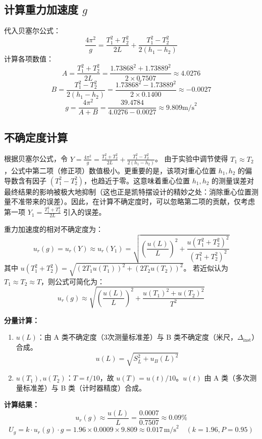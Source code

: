 \documentclass[12pt,a4paper]{article}
\begin{document}
\subsection*{计算重力加速度 $g$}
代入贝塞尔公式：
\[ \frac{4\pi^2}{g} = \frac{T_1^2 + T_2^2}{2L} + \frac{T_1^2 - T_2^2}{2(h_1 - h_2)} \]
计算各项数值：
\[ A = \frac{T_1^2 + T_2^2}{2L} = \frac{1.73868^2 + 1.73889^2}{2 \times 0.7507} \approx 4.0276 \]
\[ B = \frac{T_1^2 - T_2^2}{2(h_1 - h_2)} = \frac{1.73868^2 - 1.73889^2}{2 \times 0.1400} \approx -0.0027 \]
\[ g = \frac{4\pi^2}{A + B} = \frac{39.4784}{4.0276 - 0.0027} \approx 9.809 \text{m/s}^2 \]

\subsection*{不确定度计算}
根据贝塞尔公式，令 $Y = \frac{4\pi^2}{g} = \frac{T_1^2 + T_2^2}{2L} + \frac{T_1^2 - T_2^2}{2(h_1 - h_2)}$。
由于实验中调节使得 $T_1 \approx T_2$，公式中第二项（修正项）数值极小。更重要的是，该项对重心位置 $h_1, h_2$ 的偏导数含有因子 $(T_1^2 - T_2^2)$，也趋近于零。这意味着重心位置 $h_1, h_2$ 的测量误差对最终结果的影响被极大地抑制（这也正是凯特摆设计的精妙之处：消除重心位置测量不准带来的误差）。因此，在计算不确定度时，可以忽略第二项的贡献，仅考虑第一项 $Y_1 = \frac{T_1^2 + T_2^2}{2L}$ 引入的误差。

重力加速度的相对不确定度为：
\[ u_r(g) = u_r(Y) \approx u_r(Y_1) = \sqrt{ \left(\frac{u(L)}{L}\right)^2 + \frac{u(T_1^2 + T_2^2)^2}{(T_1^2 + T_2^2)^2} } \]
其中 $u(T_1^2 + T_2^2) = \sqrt{(2T_1 u(T_1))^2 + (2T_2 u(T_2))^2}$。
若近似认为 $T_1 \approx T_2 \approx T$，则公式可简化为：
\[ u_r(g) \approx \sqrt{ \left(\frac{u(L)}{L}\right)^2 + \frac{u(T_1)^2 + u(T_2)^2}{T^2} } \]

\noindent\textbf{分量计算：}
\begin{enumerate}
    \item $u(L)$：由 A 类不确定度（3次测量标准差）与 B 类不确定度（米尺，$\Delta_{\text{inst}}$）合成。
    \[ u(L) = \sqrt{S_{\bar{L}}^2 + u_B(L)^2} \]
    \item $u(T_1), u(T_2)$：$T = t/10$，故 $u(T) = u(t)/10$。$u(t)$ 由 A 类（多次测量标准差）与 B 类（计时器精度）合成。
\end{enumerate}

\noindent\textbf{计算结果：}
\[ u_r(g) \approx \frac{u(L)}{L} = \frac{0.0007}{0.7507} \approx 0.09\% \]
\[ U_g = k \cdot u_r(g) \cdot g = 1.96 \times 0.0009 \times 9.809 \approx 0.017 \,\text{m/s}^2 \quad (k=1.96, P=0.95) \]
\end{document}

